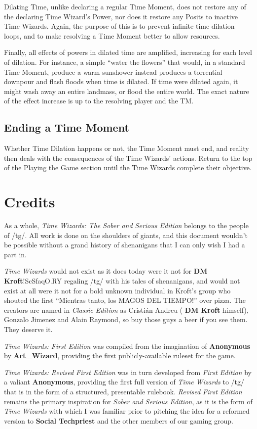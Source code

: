 \documentclass{article}
\newcommand{\twsse}{\emph{Time Wizards: The Sober and Serious Edition}}
\newcommand{\tw}{\emph{Time Wizards}}
\newcommand{\sse}{\emph{Sober and Serious Edition}}
\newcommand{\rfe}{\emph{Revised First Edition}}
\newcommand{\anon}[1][]{{\color{anongreen} \textbf{Anonymous}#1}}
\newcommand{\namefag}[2][]{{\color{anongreen} \textbf{#2}#1}}
\begin{document}
Dilating Time, unlike declaring a regular Time Moment, does not restore any of the declaring
Time Wizard's Power, nor does it restore any Posits to inactive Time Wizards. Again, the purpose
of this is to prevent infinite time dilation loops, and to make resolving a Time Moment better
to allow resources.

Finally, all effects of powers in dilated time are amplified, increasing for each level of
dilation. For instance, a simple ``water the flowers'' that would, in a standard Time Moment,
produce a warm sunshower instead produces a torrential downpour and flash floods when time is
dilated. If time were dilated again, it might wash away an entire landmass, or flood the entire
world. The exact nature of the effect increase is up to the resolving player and the TM.

\subsection{Ending a Time Moment} \label{ssec:end-moment}
Whether Time Dilation happens or not, the Time Moment must end, and reality then deals with the
consequences of the Time Wizards' actions. Return to the top of the Playing the Game section
until the Time Wizards complete their objective.

\section{Credits}
As a whole, \twsse{} belongs to the people of /tg/. All work is done on the shoulders of giants,
and this document wouldn't be possible without a grand history of shenanigans that I can only
wish I had a part in.

\tw{} would not exist as it does today were it not for \namefag[!ScSfaqO.RY]{DM Kroft} regaling
/tg/ with his tales of shenanigans, and would not exist at all were it not for a bold unknown
individual in Kroft's group who shouted the first ``Mientras tanto, los MAGOS DEL TIEMPO!'' over
pizza. The creators are named in \emph{Classic Edition} as Cristián Andreu (\namefag{DM Kroft}
himself), Gonzalo Jimenez and Alain Raymond, so buy those guys a beer if you see them. They
deserve it.

\emph{Time Wizards: First Edition} was compiled from the imagination of \anon{} by
\namefag{Art\_Wizard}, providing the first publicly-available ruleset for the game.

\emph{Time Wizards: Revised First Edition} was in turn developed from \emph{First Edition} by a
valiant \anon{}, providing the first full version of \tw{} to /tg/ that is in the form of a
structured, presentable rulebook. \rfe{} remains the primary inspiration for \sse{}, as it is the
form of \tw{} with which I was familiar prior to pitching the idea for a reformed version to
\namefag{Social Techpriest} and the other members of our gaming group.
\end{document}
